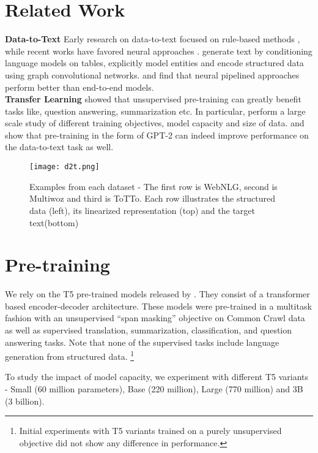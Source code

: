 \documentclass[11pt,a4paper]{article}
\begin{document}
\section{Related Work}
\textbf{Data-to-Text} Early research on data-to-text focused on rule-based  methods \cite{reiter2000building}, while recent works have favored neural approaches \cite{wen2015semantically}.  \citet{liu2018table} generate text by conditioning language models on tables,  \citet{puduppully2019data} explicitly model entities and \citet{marcheggiani2018deep} encode structured data using graph convolutional networks. \citet{ferreira2019neural} and \citet{moryossef2019step} find that neural pipelined approaches perform better than end-to-end models. \\
\textbf{Transfer Learning} \citet{devlin2018bert} showed that unsupervised pre-training can greatly benefit tasks like, question answering, summarization etc. In particular, \citet{raffel2019exploring} perform a large scale study of different training objectives, model capacity and size of data. \citet{peng2020few} and \citet{chen2019few} show that pre-training in the form of GPT-2 can indeed improve performance on the data-to-text task as well. 


\begin{figure}[h]
    \centering
    \texttt{[image: d2t.png]}
    \caption{Examples from each dataset - The first row is WebNLG, second is Multiwoz and third is ToTTo. Each row illustrates the structured data (left), its linearized representation (top) and the target text(bottom)}
    \label{fig:d2t-examples}
\end{figure}

\section{Pre-training}
We rely on the T5 pre-trained models released by \citet{raffel2019exploring}. They consist of a transformer based encoder-decoder architecture. These models were pre-trained in a multitask fashion with an unsupervised “span masking” objective on Common Crawl data as well as supervised translation,
summarization, classification, and question answering tasks. Note that none of the supervised tasks include language generation from structured data. \footnote{Initial experiments with T5 variants trained on a purely unsupervised objective did not show any difference in performance.}
\par To study the impact of model capacity, we experiment  with different T5 variants - Small (60 million parameters), Base (220 million), Large (770 million) and 3B (3 billion).
\end{document}
